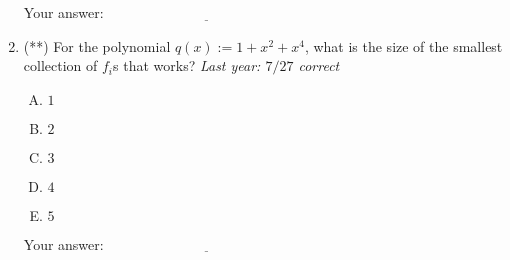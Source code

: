 \documentclass[10pt]{amsart}
\begin{document}
\begin{enumerate}
  \vspace{0.1in}
  Your answer: $\underline{\qquad\qquad\qquad\qquad\qquad\qquad\qquad}$
  \vspace{0.1in}

\item (**) For the polynomial $q(x) := 1 + x^2 + x^4$, what is the
  size of the smallest collection of $f_i$s that works? {\em Last
  year: $7/27$ correct}

  \begin{enumerate}[(A)]
  \item $1$
  \item $2$
  \item $3$
  \item $4$
  \item $5$
  \end{enumerate}

  \vspace{0.1in}
  Your answer: $\underline{\qquad\qquad\qquad\qquad\qquad\qquad\qquad}$
  \vspace{0.1in}
\end{enumerate}
\end{document}
